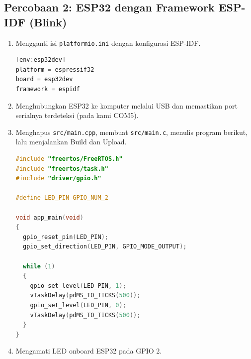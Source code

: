 \subsection{Percobaan 2: ESP32 dengan Framework ESP-IDF (Blink)}
\begin{enumerate}
	\item Mengganti isi \texttt{platformio.ini} dengan konfigurasi ESP-IDF.
\begin{lstlisting}[language=C, caption={platformio.ini Percobaan 2}]
[env:esp32dev]
platform = espressif32
board = esp32dev
framework = espidf
\end{lstlisting}

	\item Menghubungkan ESP32 ke komputer melalui USB dan memastikan port serialnya terdeteksi (pada kami COM5).
	\item Menghapus \texttt{src/main.cpp}, membuat \texttt{src/main.c}, menulis program berikut, lalu menjalankan Build dan Upload.
\begin{lstlisting}[language=C, caption={Program Blink ESP32 (ESP-IDF)}]
#include "freertos/FreeRTOS.h"
#include "freertos/task.h"
#include "driver/gpio.h"

#define LED_PIN GPIO_NUM_2

void app_main(void)
{
  gpio_reset_pin(LED_PIN);
  gpio_set_direction(LED_PIN, GPIO_MODE_OUTPUT);

  while (1)
  {
    gpio_set_level(LED_PIN, 1);
    vTaskDelay(pdMS_TO_TICKS(500));
    gpio_set_level(LED_PIN, 0);
    vTaskDelay(pdMS_TO_TICKS(500));
  }
}
\end{lstlisting}

	\item Mengamati LED onboard ESP32 pada GPIO 2.
\end{enumerate}

